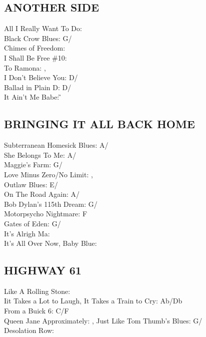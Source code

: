 \documentclass[a4paper,twoside]{memoir}
\begin{document}
 \subsection{ANOTHER SIDE}
All I Really Want To Do: \A\\ Black Crow Blues: G/\C\\ Chimes of Freedom: \G\\ I Shall Be Free \#10: \G\\ To Ramona: \C,\\
 I Don't Believe You: D/\G\\ Ballad in Plain D: D/\G\\ It Ain't Me Babe: \G


\subsection{BRINGING IT ALL BACK HOME}
Subterranean Homesick Blues: A/\D\\ She Belongs To Me: A/\D\\ Maggie's Farm: G/\C\\ Love Minus Zero/No Limit: \E,\\
 Outlaw Blues: E/\A\\ On The Road Again: A/\D\\ Bob Dylan's 115th Dream: G/\C\\ Motorpsycho Nightmare: F\\ Gates of Eden: G/\C\\ It's Alrigh Ma: \E\\ It's All Over Now, Baby Blue: \E


\subsection{HIGHWAY 61}
Like A Rolling Stone: \C\\ Iit Takes a Lot to Laugh, It Takes a Train to Cry: Ab/Db\\
From a Buick 6: C/F\\ Queen Jane Approximately: \C,
Just Like Tom Thumb's Blues: G/\C\\ Desolation Row: \E
\end{document}
